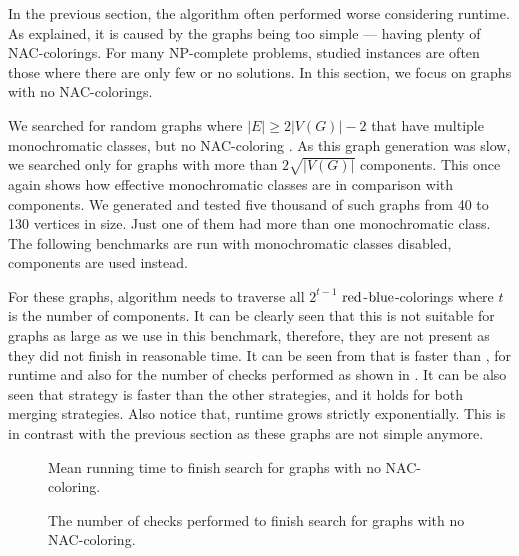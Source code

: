 In the previous section, the \Subgraphs{} algorithm
often performed worse considering runtime.
As explained, it is caused by the graphs being too simple
--- having plenty of NAC-colorings.
%
For many NP-complete problems, studied instances are often
those where there are only few or no solutions.
In this section, we focus on graphs with no NAC-colorings.

We searched for random graphs where \( |E| \ge 2|V(G)| - 2 \) that have
multiple monochromatic classes, but no NAC-coloring%
.
%
As this graph generation was slow, we searched only for
graphs with more than \( 2\sqrt{|V(G)|} \) \trcon{} components.
%
This once again shows how effective monochromatic classes are
in comparison with \trcon{} components.
We generated and tested five thousand of such graphs from 40 to 130 vertices in size.
Just one of them had more than one monochromatic class.
%
The following benchmarks are run with monochromatic classes disabled,
\trcon{} components are used instead.

For these graphs, \NaiveCycles{} algorithm needs to traverse all \( 2^{t-1} \) \(\text{red}\)-\(\text{blue}\)-colorings
where \( t \) is the number of \trcon{} components. It can be clearly seen that
this is not suitable for graphs as large as we use in this benchmark,
therefore, they are not present as they did not finish in reasonable time.
It can be seen from 
that \SharedVertices{} is faster than \MergeLinear{},
for runtime and also for the number of checks performed
as shown in .
%
It can be also seen that \NeighborsDegree{} strategy is
faster than the other strategies, and it holds for both merging strategies.
Also notice that,
runtime grows strictly exponentially.
This is in contrast with the previous section
as these graphs are not simple anymore.

\begin{figure}[thbp]
	\centering
	\scalebox{\BenchFigureScale}{}
	\caption[Mean runtime for graphs with no NAC-coloring]{
		Mean running time to finish search for graphs with no NAC-coloring.}%
	\label{fig:graph_no_nac_coloring_first_runtime}
\end{figure}%
\begin{figure}[thbp]
	\centering
	\scalebox{\BenchFigureScale}{}
	\caption[Checks performed for graphs with no NAC-coloring]{
		The number of checks performed to finish search for graphs with no NAC-coloring.}%
	\label{fig:graph_no_nac_coloring_first_checks}
\end{figure}%

